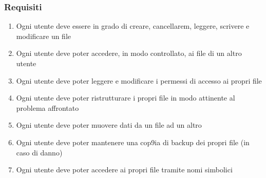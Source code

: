 \subsubsection*{Requisiti}
\begin{enumerate}
    \item Ogni utente deve essere in grado di creare, cancellarem, leggere, scrivere e modificare un file
    \item Ogni utente deve poter accedere, in modo controllato, ai file di un altro utente
    \item Ogni utente deve poter leggere e modificare i permessi di accesso ai propri file
    \item Ogni utente deve poter ristrutturare i propri file in modo attinente al problema affrontato
    \item Ogni utente deve poter muovere dati da un file ad un altro
    \item Ogni utente deve poter mantenere una cop9ia di backup dei propri file (in caso di danno)
    \item Ogni utente deve poter accedere ai propri file tramite nomi simbolici
\end{enumerate}
